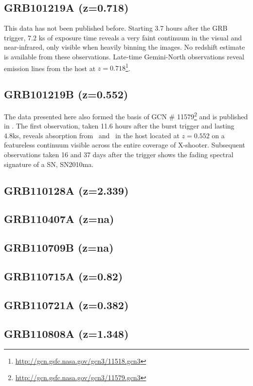 \documentclass{aa}    %
\begin{document}
\subsection{GRB101219A (z=0.718)}
This data has not been published before. Starting 3.7 hours after the GRB
trigger, 7.2 ks of exposure time reveals a very faint continuum in the visual
and near-infrared, only visible when heavily binning the images. No redshift
estimate is available from these observations.  Late-time Gemini-North
observations reveal emission lines from the host at
$z=0.718$\footnote{\url{http://gcn.gsfc.nasa.gov/gcn3/11518.gcn3}}.

\subsection{GRB101219B (z=0.552)}
The data presented here also formed the basis of GCN \#
11579\footnote{\url{http://gcn.gsfc.nasa.gov/gcn3/11579.gcn3}} and is published
in \citet{Sparre2011}.	The first observation, taken 11.6 hours after the burst
trigger and lasting 4.8ks, reveals absorption from \mgii~and \mgi~in the host
located at $z = 0.552$ on a featureless continuum visible across the entire
coverage of X-shooter.  Subsequent observations taken 16 and 37 days after the
trigger shows the fading spectral signature of a SN, SN2010ma.


\subsection{GRB110128A (z=2.339)}

\subsection{GRB110407A (z=na)}

\subsection{GRB110709B (z=na)}

\subsection{GRB110715A (z=0.82)}

\subsection{GRB110721A (z=0.382)}

\subsection{GRB110808A (z=1.348)}
\end{document}
